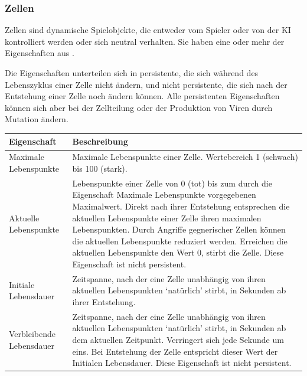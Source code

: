 \subsubsection{Zellen}
\label{sec:zellen}

Zellen sind dynamische Spielobjekte, die entweder vom Spieler oder von der KI
kontrolliert werden oder sich neutral verhalten. Sie haben eine oder mehr
der Eigenschaften aus .

Die Eigenschaften unterteilen sich in persistente, die sich während des
Lebenszyklus einer Zelle nicht ändern, und nicht persistente, die sich
nach der Entstehung einer Zelle noch ändern können. Alle persistenten
Eigenschaften können sich aber bei der Zellteilung oder der Produktion von Viren
durch Mutation ändern.

\begin{table}
  \begin{tabu} to \linewidth {|l|X|}
    \hline
    Eigenschaft &
      Beschreibung\\\hline

    Maximale Lebenspunkte &
      Maximale Lebenspunkte einer Zelle. Wertebereich 1 (schwach) bis 100
      (stark).\\\hline

    Aktuelle Lebenspunkte &
      Lebenspunkte einer Zelle von 0 (tot) bis zum durch die Eigenschaft
      Maximale Lebenspunkte vorgegebenen Maximalwert. Direkt nach ihrer
      Entstehung entsprechen die aktuellen Lebenspunkte einer Zelle ihren
      maximalen Lebenspunkten. Durch Angriffe gegnerischer Zellen können
      die aktuellen Lebenspunkte reduziert werden. Erreichen die aktuellen
      Lebenspunkte den Wert 0, stirbt die Zelle. Diese Eigenschaft ist
      nicht persistent.\\\hline

    Initiale Lebensdauer &
      Zeitspanne, nach der eine Zelle unabhängig von ihren aktuellen
      Lebenspunkten \enquote*{natürlich} stirbt, in Sekunden ab ihrer
      Entstehung.\\\hline

    Verbleibende Lebensdauer &
      Zeitspanne, nach der eine Zelle unabhängig von ihren aktuellen
      Lebenspunkten \enquote*{natürlich} stirbt, in Sekunden ab dem aktuellen
      Zeitpunkt. Verringert sich jede Sekunde um eins. Bei Entstehung der
      Zelle entspricht dieser Wert der Initialen Lebensdauer. Diese
      Eigenschaft ist nicht persistent.\\\hline


\end{tabu}
\end{table}
